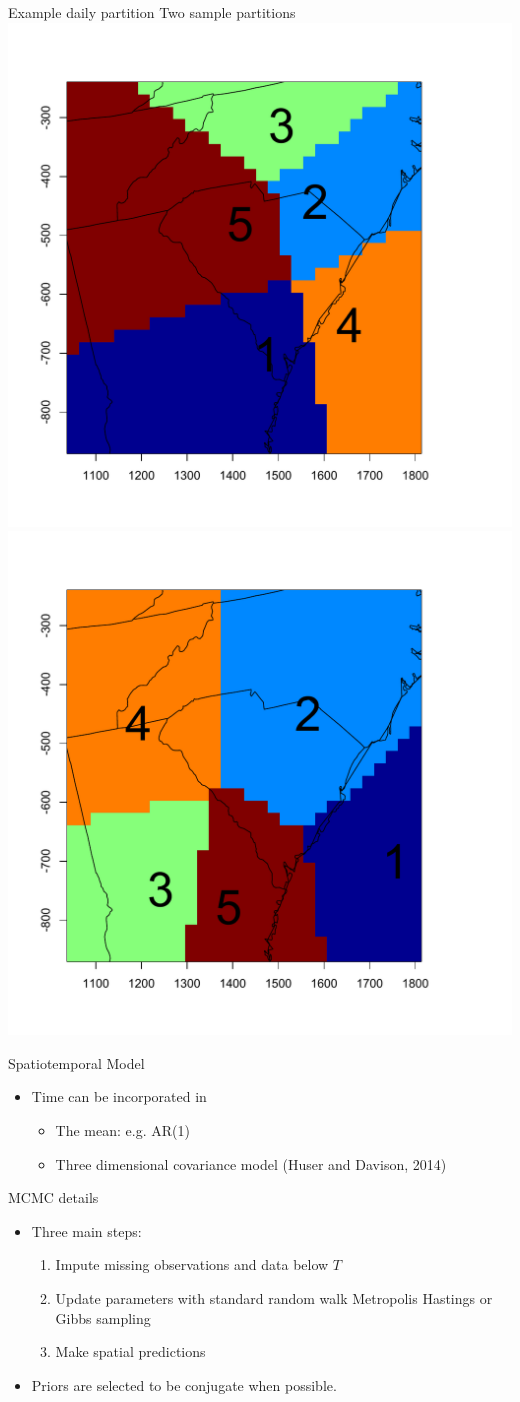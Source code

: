 \documentclass{beamer}
\begin{document}
\begin{frame}{Example daily partition}
	Two sample partitions
    \centering
    \includegraphics[width=0.54\linewidth]{./plots/example-partition-1.pdf}
    \includegraphics[width=0.54\linewidth]{./plots/example-partition-2.pdf}
\end{frame}

\begin{frame}{Spatiotemporal Model}
  \begin{itemize} \setlength{\itemsep}{0.5em}
    \item Time can be incorporated in 
    \begin{itemize}
    	\item The mean: e.g. AR(1)
	\item Three dimensional covariance model (Huser and Davison, 2014) 
    \end{itemize}
  \end{itemize}
\end{frame}

\begin{frame}{MCMC details}
  \begin{itemize} \setlength{\itemsep}{0.5em}
    \item Three main steps:
    \begin{enumerate}[1.]
      \item Impute missing observations and data below $T$
      \item Update parameters with standard random walk Metropolis Hastings or Gibbs sampling
      \item Make spatial predictions
    \end{enumerate}
    \item Priors are selected to be conjugate when possible.
  \end{itemize}
\end{frame}
\end{document}
